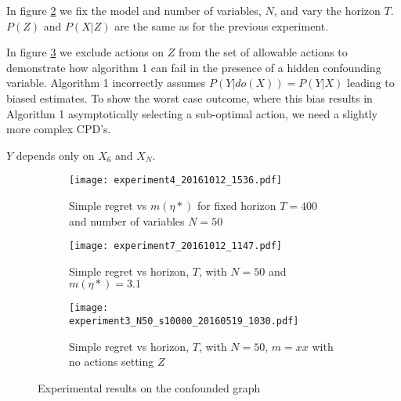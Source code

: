 In figure \ref{fig:simple_vs_T_general} we fix the model and number of variables, $N$, and vary the horizon $T$. $P(Z)$ and $P(X|Z)$ are the same as for the previous experiment.  

In figure \ref{fig:simple_vs_T_misspecified} we exclude actions on $Z$ from the set of allowable actions to demonstrate how algorithm 1 can fail in the presence of a hidden confounding variable. Algorithm 1 incorrectly assumes $P(Y|do(X)) = P(Y|X)$ leading to biased estimates. To show the worst case outcome, where this bias results in Algorithm 1 asymptotically selecting a sub-optimal action, we need a slightly more complex CPD's. 


$Y$ depends only on $X_6$ and $X_N$. 

\begin{figure}[H]
    \begin{subfigure}[t]{0.3\textwidth}
		\centering    
    		\texttt{[image: experiment4\_20161012\_1536.pdf]}
    		\caption{Simple regret vs $m(\eta*)$ for fixed horizon $T=400$ and number of variables $N = 50$}
        \label{fig:simple_vs_m_general}
    \end{subfigure}\hfill
    \begin{subfigure}[t]{0.3\textwidth}
    		\centering
        \texttt{[image: experiment7\_20161012\_1147.pdf]}
    		\caption{Simple regret vs horizon, $T$, with $N = 50$ and $m(\eta*)=3.1$ }
        \label{fig:simple_vs_T_general}
    \end{subfigure}\hfill
    \begin{subfigure}[t]{0.3\textwidth}
    		\centering
    		\texttt{[image: experiment3\_N50\_s10000\_20160519\_1030.pdf]}
    		\caption{Simple regret vs horizon, $T$, with $N = 50$, $m=xx$ with no actions setting $Z$}
    		\label{fig:simple_vs_T_misspecified}
    \end{subfigure}
    \caption{Experimental results on the confounded graph}
    \label{fig:experiments}
\end{figure}


